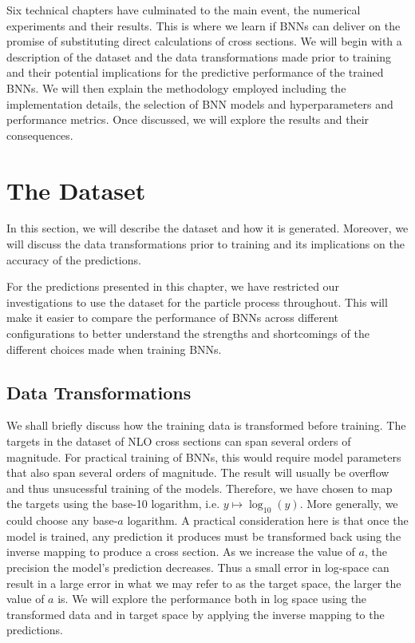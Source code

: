 Six technical chapters have culminated to the main event, the numerical experiments and their results. This is where we learn if BNNs can deliver on the promise of substituting direct calculations of cross sections. We will begin with a description of the dataset and the data transformations made prior to training and their potential implications for the predictive performance of the trained BNNs. We will then explain the methodology employed including the implementation details, the selection of BNN models and hyperparameters and performance metrics. Once discussed, we will explore the results and their consequences.



\section{The Dataset}\label{sec:dataset}
In this section, we will describe the dataset and how it is generated. Moreover, we will discuss the data transformations prior to training and its implications on the accuracy of the predictions.

For the predictions presented in this chapter, we have restricted our investigations to use the dataset for the particle process throughout. This will make it easier to compare the performance of BNNs across different configurations to better understand the strengths and shortcomings of the different choices made when training BNNs. 


\subsection{Data Transformations}\label{sec:data_transform}
We shall briefly discuss how the training data is transformed before training.
The targets in the dataset of NLO cross sections can span several orders of magnitude. For practical training of BNNs, this would require
model parameters that also span several orders of magnitude. The result will usually be overflow and thus unsucessful training of the models.
Therefore, we have chosen to map the targets using the base-10 logarithm, i.e. $y \mapsto \log_{10}(y)$. More generally, we could choose any base-$a$ logarithm. A practical consideration here is that once the model is trained, any prediction it produces must be transformed back using
the inverse mapping to produce a cross section. As we increase the value of $a$, the precision the model's prediction decreases. Thus a small error in log-space 
can result in a large error in what we may refer to as the target space, the larger the value of $a$ is. 
We will explore the performance both in log space using the transformed data and in target space by applying the inverse mapping to the predictions.

